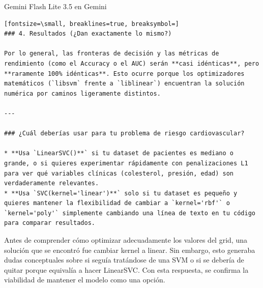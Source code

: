 \documentclass[12pt,a4paper,oneside]{book}
\begin{document}
\begin{iaresp}{Gemini Flash Lite 3.5 en Gemini}
\begin{Verbatim}[fontsize=\small, breaklines=true, breaksymbol=]
### 4. Resultados (¿Dan exactamente lo mismo?)

Por lo general, las fronteras de decisión y las métricas de rendimiento (como el Accuracy o el AUC) serán **casi idénticas**, pero **raramente 100% idénticas**. Esto ocurre porque los optimizadores matemáticos (`libsvm` frente a `liblinear`) encuentran la solución numérica por caminos ligeramente distintos.

---

### ¿Cuál deberías usar para tu problema de riesgo cardiovascular?

* **Usa `LinearSVC()**` si tu dataset de pacientes es mediano o grande, o si quieres experimentar rápidamente con penalizaciones L1 para ver qué variables clínicas (colesterol, presión, edad) son verdaderamente relevantes.
* **Usa `SVC(kernel='linear')**` solo si tu dataset es pequeño y quieres mantener la flexibilidad de cambiar a `kernel='rbf'` o `kernel='poly'` simplemente cambiando una línea de texto en tu código para comparar resultados.
\end{Verbatim}
\end{iaresp}
\begin{iaanalisis}
Antes de comprender cómo optimizar adecuadamente los valores del grid, una solución que se encontró fue cambiar kernel a linear. Sin embargo, esto generaba dudas conceptuales sobre si seguía tratándose de una SVM o si se debería de quitar porque equivalía a hacer LinearSVC. Con esta respuesta, se confirma la viabilidad de mantener el modelo como una opción.
\end{iaanalisis}
\end{document}
